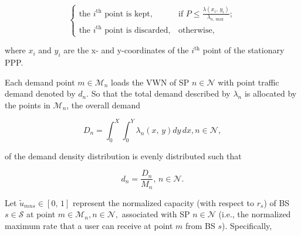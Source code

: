 \documentclass[12pt,dvipsnames]{report}
\newif\ifisdoublespacing
\begin{document}
\ifisdoublespacing
\begin{singlespacing}
\begin{equation} \label{eq:nsPPPaccrej}
\begin{cases}
	\text{the $i^{\text{th}}$ point is kept},& \text{if } P \leq \frac{\lambda\left( x_i,\, y_i \right)}{\lambda_{n,\max}};\\
	\\
	\text{the $i^{\text{th}}$ point is discarded},& \text{otherwise,}
\end{cases}
\end{equation}
\end{singlespacing}
\else
\begin{equation} \label{eq:nsPPPaccrej}
\begin{cases}
	\text{the $i^{\text{th}}$ point is kept},& \text{if } P \leq \frac{\lambda\left( x_i,\, y_i \right)}{\lambda_{n,\max}};\\
	\text{the $i^{\text{th}}$ point is discarded},& \text{otherwise,}
\end{cases}
\end{equation}
\fi

\noindent where $x_i$ and $y_i$ are the x- and y-coordinates of the $i^{\text{th}}$ point of the stationary PPP.

Each demand point $m \in \mathcal{M}_n$ loads the VWN of SP $n \in \mathcal{N}$ with point traffic demand denoted by $d_{n}$.  So that the total demand described by $\lambda_n$ is allocated by the points in $\mathcal{M}_n$, the overall demand 

\begin{equation} \label{eq:demandintegral}
D_n = \int_0^X \int_0^Y \lambda_n\left( x,\, y \right) dy \, dx, n \in \mathcal{N},
\end{equation}

\noindent of the demand density distribution is evenly distributed such that

\begin{equation} \label{eq:pointdemand}
d_{n} = \frac{D_n}{M_n},\, n \in \mathcal{N}.
\end{equation}

Let $\tilde{u}_{mns} \in \left[ 0,\, 1 \right]$ represent the normalized capacity (with respect to $r_s$) of BS $s \in \mathcal{S}$ at point $m \in \mathcal{M}_n, n \in \mathcal{N},$ associated with SP $n \in \mathcal{N}$ (i.e., the normalized maximum rate that a user can receive at point $m$ from BS $s$).  Specifically,
\end{document}
